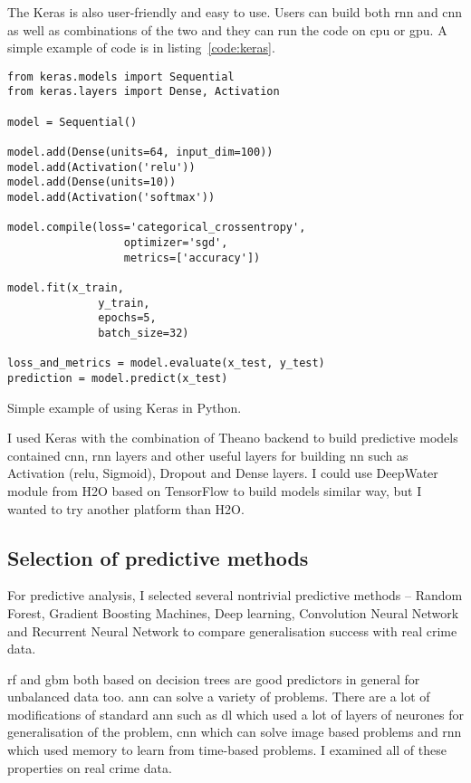 \documentclass[thesis=M,english]{FITthesis}[2012/10/20]
\begin{document}
The Keras is also user-friendly and easy to use. Users can build both \gls{rnn} and \gls{cnn} as well as combinations of the two and they can run the code on \gls{cpu} or \gls{gpu}. A simple example of code is in listing~\ref{code:keras}.

\begin{listing}
\begin{scriptsize}
\begin{verbatim}
from keras.models import Sequential
from keras.layers import Dense, Activation

model = Sequential()

model.add(Dense(units=64, input_dim=100))
model.add(Activation('relu'))
model.add(Dense(units=10))
model.add(Activation('softmax'))

model.compile(loss='categorical_crossentropy',
                  optimizer='sgd',
                  metrics=['accuracy'])
              
model.fit(x_train,
              y_train, 
              epochs=5, 
              batch_size=32)
          
loss_and_metrics = model.evaluate(x_test, y_test)                      
prediction = model.predict(x_test)  
\end{verbatim}
\caption{Simple example of using Keras in Python.}
\label{code:keras}
\end{scriptsize}
\end{listing}

I used Keras with the combination of Theano backend to build predictive models contained \gls{cnn}, \gls{rnn} layers and other useful layers for building \gls{nn} such as Activation (\gls{relu}, Sigmoid), Dropout and Dense layers. I could use DeepWater\cite{h2o_deepwater} module from H2O based on TensorFlow to build models similar way, but I wanted to try another platform than H2O.

\subsection{Selection of predictive methods}

For predictive analysis, I selected several nontrivial predictive methods -- Random Forest, Gradient Boosting Machines, Deep learning, Convolution Neural Network and Recurrent Neural Network to compare generalisation success with real crime data. 

\gls{rf} and \gls{gbm} both based on decision trees are good predictors in general for unbalanced data too. \gls{ann} can solve a variety of problems. There are a lot of modifications of standard \gls{ann} such as \gls{dl} which used a lot of layers of neurones for generalisation of the problem, \gls{cnn} which can solve image based problems and \gls{rnn} which used memory to learn from time-based problems. I examined all of these properties on real crime data.
\end{document}
